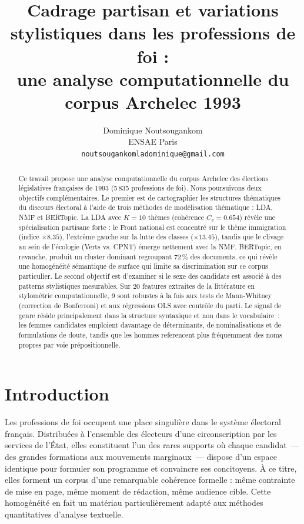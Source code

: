 \documentclass{article}
\title{Cadrage partisan et variations stylistiques dans les professions de foi :\\
une analyse computationnelle du corpus Archelec 1993}
\author{%
  Dominique Noutsougankom\\
  ENSAE Paris\\
  \texttt{noutsougankomladominique@gmail.com}
}
\begin{document}
\maketitle

\begin{abstract}
Ce travail propose une analyse computationnelle du corpus Archelec des élections
législatives françaises de 1993 (5\,835 professions de foi).
Nous poursuivons deux objectifs complémentaires.
Le premier est de cartographier les structures thématiques du discours électoral
à l'aide de trois méthodes de modélisation thématique : LDA, NMF et BERTopic.
La LDA avec $K=10$ thèmes (cohérence $C_v = 0.654$) révèle une spécialisation
partisane forte : le Front national est concentré sur le thème immigration
(indice $\times 8.35$), l'extrême gauche sur la lutte des classes ($\times 13.45$),
tandis que le clivage au sein de l'écologie (Verts vs. CPNT) émerge nettement
avec la NMF. BERTopic, en revanche, produit un cluster dominant regroupant
72\,\% des documents, ce qui révèle une homogénéité sémantique de surface
qui limite sa discrimination sur ce corpus particulier.
Le second objectif est d'examiner si le sexe des candidats est associé à
des patterns stylistiques mesurables.
Sur 20 features extraites de la littérature en stylométrie computationnelle,
9 sont robustes à la fois aux tests de Mann-Whitney (correction de Bonferroni)
et aux régressions OLS avec contrôle du parti.
Le signal de genre réside principalement dans la structure syntaxique et
non dans le vocabulaire~: les femmes candidates emploient davantage de
déterminants, de nominalisations et de formulations de doute, tandis que
les hommes referencent plus fréquemment des noms propres par voie prépositionnelle.
\end{abstract}

\section{Introduction}
\label{sec:intro}

Les professions de foi occupent une place singulière dans le système électoral
français. Distribuées à l'ensemble des électeurs d'une circonscription par
les services de l'État, elles constituent l'un des rares supports où chaque
candidat~--- des grandes formations aux mouvements marginaux~--- dispose d'un
espace identique pour formuler son programme et convaincre ses concitoyens.
À ce titre, elles forment un corpus d'une remarquable cohérence formelle :
même contrainte de mise en page, même moment de rédaction, même audience cible.
Cette homogénéité en fait un matériau particulièrement adapté aux méthodes
quantitatives d'analyse textuelle.
\end{document}
